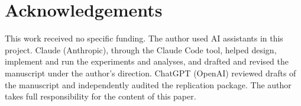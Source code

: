 \section*{Acknowledgements}

This work received no specific funding. The author used AI assistants in this project. Claude (Anthropic), through the Claude Code tool, helped design, implement and run the experiments and analyses, and drafted and revised the manuscript under the author's direction. ChatGPT (OpenAI) reviewed drafts of the manuscript and independently audited the replication package. The author takes full responsibility for the content of this paper.





